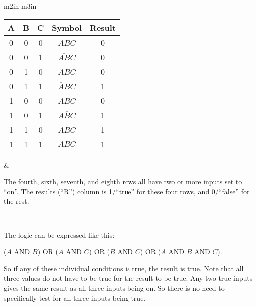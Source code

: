 \begin{tabular}{m{2in} m{3in}}
\renewcommand{\arraystretch}{1.2}
\begin{tabular}{ccccc}
\hline
A & B & C & Symbol           & Result\\
\hline
0 & 0 & 0 & $\overline{ABC}$ & 0\\
0 & 0 & 1 & $\overline{AB}C$ & 0\\
0 & 1 & 0 & $\overline{A}B\overline{C}$ & 0\\
0 & 1 & 1 & $\overline{A}BC$ & 1\\
1 & 0 & 0 & $A\overline{BC}$ & 0\\
1 & 0 & 1 & $A\overline{B}C$ & 1\\
1 & 1 & 0 & $AB\overline{C}$ & 1\\
1 & 1 & 1 & $ABC$ & 1\\
\hline
\end{tabular}

&

The fourth, sixth, seventh, and eighth rows all have two or more inputs set to ``on''. The results (``R'') column is 1/``true'' for these four rows, and 0/``false'' for the rest. 

\\
\end{tabular}
\renewcommand{\arraystretch}{1.0}

The logic can be expressed like this: 

($A$ AND $B$) OR ($A$ AND $C$) OR ($B$ AND $C$) OR ($A$ AND $B$ AND $C$).

So if any of these individual conditions is true, the result is true.
Note that all three values do not have to be true for the result to be true. Any two true inputs gives the same result as all three inputs being on. So there is no need to specifically test for all three inputs being true.

